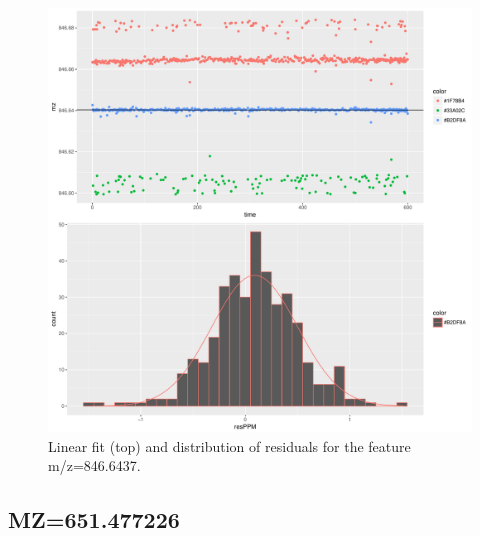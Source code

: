 \documentclass[]{article}
\begin{document}
\begin{figure}[H]
\begin{center}
\includegraphics{Supplementary_document_files/figure-latex/filter.lm.846-1.pdf}
\caption{Linear fit (top) and distribution of residuals for the  feature m/z=846.6437.}
\label{ig:chk.mz.846.6437}
\end{center}
\end{figure}


\subsection{MZ=651.477226}\label{mz651.477226}
\end{document}
